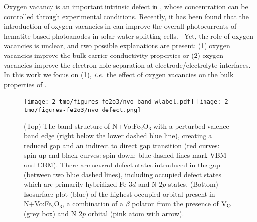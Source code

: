 
Oxygen vacancy is an important intrinsic defect in , whose concentration can be controlled through experimental conditions. Recently, it has been found that the introduction of oxygen vacancies in  can improve the overall photocurrents of hematite based photoanodes in solar water splitting cells.~\cite{forster2015oxygen} Yet, the role of oxygen vacancies is unclear, and two possible explanations are present: (1) oxygen vacancies improve the bulk carrier conductivity properties or (2) oxygen vacancies improve the electron hole separation at electrode/electrolyte interfaces. In this work we focus on (1), \textit{i.e.}\ the effect of oxygen vacancies on the bulk properties of .



\begin{figure}
\begin{center}
\texttt{[image: 2-tmo/figures-fe2o3/nvo\_band\_wlabel.pdf]}
\texttt{[image: 2-tmo/figures-fe2o3/nvo\_defect.png]}
\caption{(Top) The band structure of N+Vo:Fe$_2$O$_3$ with a perturbed valence band edge (right below the lower dashed blue line), creating a reduced gap and an indirect to direct gap transition (red curves: spin up and black curves: spin down; blue dashed lines mark VBM and CBM). There are several defect states introduced in the gap (between two blue dashed lines), including occupied defect states which are primarily hybridized Fe $3d$ and N $2p$ states. (Bottom) Isosurface plot (blue) of the highest occupied orbital present in N+Vo:Fe$_2$O$_3$, a combination of a $\beta$ polaron from the presence of $\text{V}_\text{O}$ (grey box) and N $2p$ orbital (pink atom with arrow).} \label{fe2o3:fig:nvo}
\end{center}
\end{figure}

